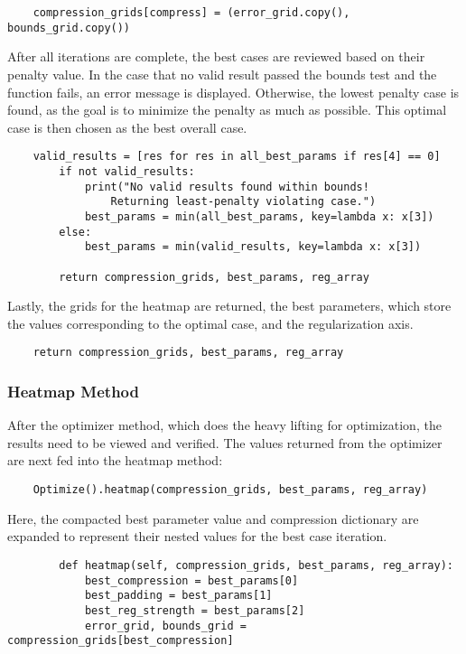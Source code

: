 \documentclass[11pt, a4paper]{article}
\theoremstyle{definition}
\numberwithin{equation}{section}
\begin{document}
\begin{verbatim}
    compression_grids[compress] = (error_grid.copy(), bounds_grid.copy())
\end{verbatim}

After all iterations are complete, the best cases are reviewed based on their penalty value. In the case that no valid result passed the bounds test and the function fails, an error message is displayed. Otherwise, the lowest penalty case is found, as the goal is to minimize the penalty as much as possible. This optimal case is then chosen as the best overall case.

\begin{verbatim}
    valid_results = [res for res in all_best_params if res[4] == 0]
        if not valid_results:
            print("No valid results found within bounds! 
                Returning least-penalty violating case.")
            best_params = min(all_best_params, key=lambda x: x[3])
        else:
            best_params = min(valid_results, key=lambda x: x[3])

        return compression_grids, best_params, reg_array
\end{verbatim}

Lastly, the grids for the heatmap are returned, the best parameters, which store the values corresponding to the optimal case, and the regularization axis.

\begin{verbatim}
    return compression_grids, best_params, reg_array
\end{verbatim}

\subsubsection{Heatmap Method}

After the optimizer method, which does the heavy lifting for optimization, the results need to be viewed and verified. The values returned from the optimizer are next fed into the heatmap method:

\begin{verbatim}
    Optimize().heatmap(compression_grids, best_params, reg_array)
\end{verbatim}

Here, the compacted best parameter value and compression dictionary are expanded to represent their nested values for the best case iteration.

\begin{verbatim}
        def heatmap(self, compression_grids, best_params, reg_array):
            best_compression = best_params[0]
            best_padding = best_params[1]
            best_reg_strength = best_params[2]
            error_grid, bounds_grid = compression_grids[best_compression]
\end{verbatim}
\end{document}
